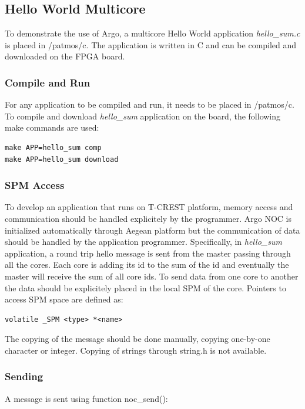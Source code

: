 \documentclass[a4paper,fontsize=10pt,twoside,DIV15,BCOR12mm,headinclude=true,footinclude=false,pagesize,bibtotoc]{scrbook}
\begin{document}
\subsection{Hello World Multicore}

To demonstrate the use of Argo, a multicore Hello World application \textit{hello\_sum.c} is placed in /patmos/c.
The application is written in C and can be compiled and downloaded on the FPGA board.

\subsubsection{Compile and Run}
For any application to be compiled and run, it needs to be placed in /patmos/c. To compile and download \textit{hello\_sum} application on the board, the following make commands are used:

\begin{verbatim}
make APP=hello_sum comp
make APP=hello_sum download
\end{verbatim}

\subsubsection{SPM Access}
To develop an application that runs on T-CREST platform, memory access and 
communication should be handled explicitely by the programmer. Argo NOC is initialized automatically 
through Aegean platform but the communication of data should be handled by the application programmer.
Specifically, in \textit{hello\_sum} application, a round trip hello message is sent from the master
passing through all the cores. Each core is adding its id to the sum of the id and 
eventually the master will receive the sum of all core ids. To send data from one core to another 
the data should be explicitely placed in the local SPM of the core. Pointers to access SPM space are defined as:

\begin{lstlisting}
volatile _SPM <type> *<name>
\end{lstlisting}

The copying of the message should be done manually, copying one-by-one character or integer.
Copying of strings through string.h is not available. 


\subsubsection{Sending}
A message is sent using function noc\_send():
\end{document}
